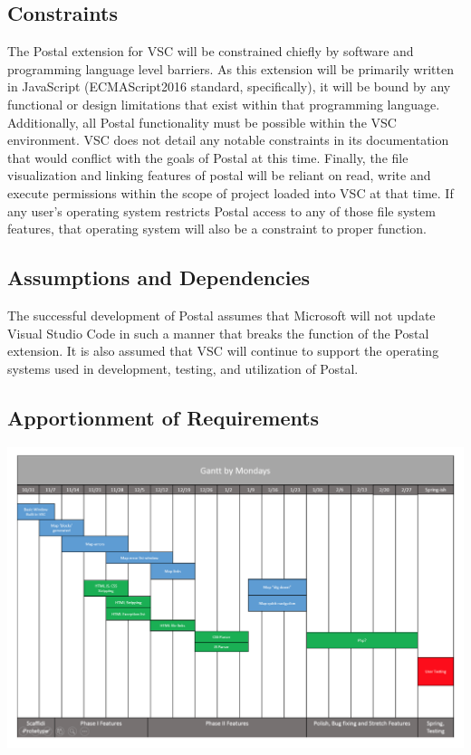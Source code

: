 \documentclass[letterpaper,10pt,titlepage,draftclsnofoot,onecolumn,onesided] {IEEEtran}
\begin{document}
\subsection{Constraints}
The Postal extension for VSC will be constrained chiefly by software and programming language level barriers.
As this extension will be primarily written in JavaScript (ECMAScript2016 standard, specifically), it will be bound by any functional or design limitations that exist within that programming language. 
Additionally, all Postal functionality must be possible within the VSC environment. 
VSC does not detail any notable constraints in its documentation that would conflict with the goals of Postal at this time. 
Finally, the file visualization and linking features of postal will be reliant on read, write and execute permissions within the scope of project loaded into VSC at that time. If any user's operating system restricts Postal access to any of those file system features, that operating system will also be a constraint to proper function.

\subsection{Assumptions and Dependencies}
The successful development of Postal assumes that Microsoft will not update Visual Studio Code in such a manner that breaks the function of the Postal extension. It is also assumed that VSC will continue to support the operating systems used in development, testing, and utilization of Postal.

\subsection{Apportionment of Requirements}
\includegraphics[scale=0.7]{gantt.png}
\end{document}
